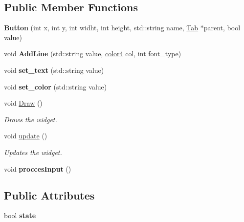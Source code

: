 \subsection*{Public Member Functions}
\begin{DoxyCompactItemize}
\item 
\mbox{\label{class_button_ad4ec63768bcd166b3f08a98b89a55e5e}} 
{\bfseries Button} (int x, int y, int widht, int height, std\+::string name, \hyperlink{class_tab}{Tab} $\ast$parent, bool value)
\item 
\mbox{\label{class_button_af16dc42e3b7aa079f8ea86f6fdfb722c}} 
void {\bfseries Add\+Line} (std\+::string value, \hyperlink{structcolor4}{color4} col, int font\+\_\+type)
\item 
\mbox{\label{class_button_a21ecdd8c53f112c6714701d4152fe6d1}} 
void {\bfseries set\+\_\+text} (std\+::string value)
\item 
\mbox{\label{class_button_ac043c6a209451544e13ad2d67f6ed9d8}} 
void {\bfseries set\+\_\+color} (std\+::string value)
\item 
void \hyperlink{class_button_a6aaa2b781c933a296f41a8eca890eb1f}{Draw} ()
\begin{DoxyCompactList}\small\item\em Draws the widget. \end{DoxyCompactList}\item 
void \hyperlink{class_button_ad8e030c1c8846d43f3126047d4a3667f}{update} ()
\begin{DoxyCompactList}\small\item\em Updates the widget. \end{DoxyCompactList}\item 
\mbox{\label{class_button_a9c7fe06bed140fc1f7bcdaa3126547b0}} 
void {\bfseries procces\+Input} ()
\end{DoxyCompactItemize}
\subsection*{Public Attributes}
\begin{DoxyCompactItemize}
\item 
\mbox{\label{class_button_a94ca33a0ae5cbfefdc7b9d5d8cdaa5b4}} 
bool {\bfseries state}
\end{DoxyCompactItemize}


